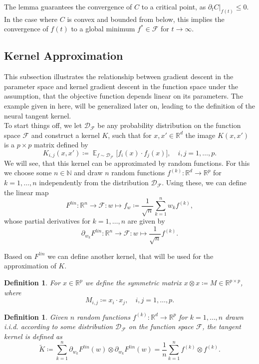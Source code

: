 \documentclass[11pt, a4paper]{article}
\newtheorem{definition}[theorem]{Definition}
\newcommand{\N}{\mathbb{N}}
\newcommand{\R}{\mathbb{R}}
\newcommand{\D}{\mathcal{D}}
\newcommand{\F}{\mathcal{F}}
\DeclareMathOperator*{\E}{\mathbb{E}}
\begin{document}
The lemma guarantees the convergence of $C$ to a critical point, as $\partial_tC|_{f(t)} \leq 0$. In the case where $C$ is convex and bounded from below, this implies the convergence of $f(t)$ to a global minimum $f^* \in \F$ for $t \to \infty$.

\subsection{Kernel Approximation} \label{sec:approximation}

This subsection illustrates the relationship between gradient descent in the parameter space and kernel gradient descent in the function space under the assumption, that the objective function depends linear on its parameters. The example given in here, will be generalized later on, leading to the definition of the neural tangent kernel. \\

To start things off, we let $\D_{\F}$ be any probability distribution on the function space $\F$ and construct a kernel $K$, such that for $x,x' \in \R^d$ the image $K(x,x')$ is a $p \times p$ matrix defined by
\[ K_{i,j}(x,x') \coloneq \E_{f \sim \D_{\F}} \Big [ f_i(x) \cdot f_j(x) \Big ], \quad i,j=1,\dots,p. \]
We will see, that this kernel can be approximated by random functions. For this we choose some $n \in \N$ and draw $n$ random functions $f^{(k)} : \R^d \to \R^p$ for $k=1,\dots,n$ independently from the distribution $\D_{\F}$. Using these, we can define the linear map
\[ F^\textit{lin}: \R^n \to \F : w \mapsto f_w \coloneq \frac{1}{\sqrt{n}} \sum_{k=1}^{n}w_kf^{(k)}, \]
whose partial derivatives for $k=1,\dots,n$ are given by
\[ \partial_{w_{k}}F^\textit{lin} : \R^n \to \F: w \mapsto \frac{1}{\sqrt{n}}f^{(k)}. \]

Based on $F^\textit{lin}$ we can define another kernel, that will be used for the approximation of $K$.

\begin{definition}
For $x \in \R^p$ we define the symmetric matrix $x \otimes x \coloneq M \in \R^{p \times p}$, where
\[ M_{i,j} \coloneq x_i \cdot x_j, \quad  i,j=1,\dots,p. \]
\end{definition}

\begin{definition}
Given $n$ random functions $f^{(k)} : \R^d \to \R^p$ for $k=1,\dots,n$ drawn i.i.d. according to some distribution $\D_{\F}$ on the function space $\F$, the tangent kernel is defined as
\[ \tilde{K} \coloneq \sum_{k=1}^{n} \partial_{w_k} F^\textit{lin}(w) \otimes \partial_{w_k} F^\textit{lin}(w) = \frac{1}{n} \sum_{k=1}^{n} f^{(k)} \otimes f^{(k)}. \]
\end{definition}
\end{document}
